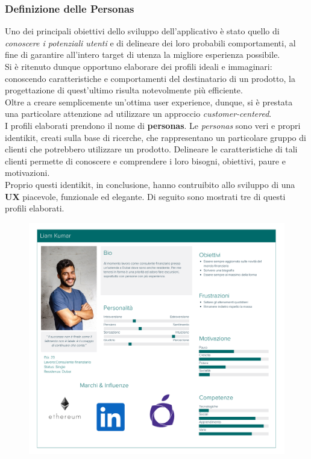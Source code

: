 \documentclass{natourDoc}
\begin{document}
\subsubsection{Definizione delle Personas}
Uno dei principali obiettivi dello sviluppo dell'applicativo è stato quello di \textit{conoscere i potenziali utenti} 
e di delineare dei loro probabili comportamenti, al fine di garantire all'intero target di utenza la migliore esperienza 
possibile. \\
Si è ritenuto dunque opportuno elaborare dei profili ideali e immaginari: conoscendo caratteristiche e comportamenti del destinatario 
di un prodotto, la progettazione di quest'ultimo risulta notevolmente più efficiente. \\
Oltre a creare semplicemente un'ottima user experience, dunque, si è prestata una particolare attenzione ad utilizzare un approccio \textit{customer-centered}. \\
I profili elaborati prendono il nome di \textbf{personas}. Le \textit{personas} sono veri e propri identikit, creati sulla base di ricerche, che rappresentano un particolare
gruppo di clienti che potrebbero utilizzare un prodotto. Delineare le caratteristiche di tali clienti permette di conoscere e comprendere i 
loro bisogni, obiettivi, paure e motivazioni.\\
Proprio questi identikit, in conclusione, hanno contruibito allo sviluppo di una \textbf{UX} piacevole, funzionale ed elegante. Di seguito sono mostrati tre di questi profili elaborati. \\

\begin{figure}[!htbp]
	\centering
	\includegraphics[width=\textwidth]{./personas/personas-kumar.pdf}
\end{figure}
\end{document}
